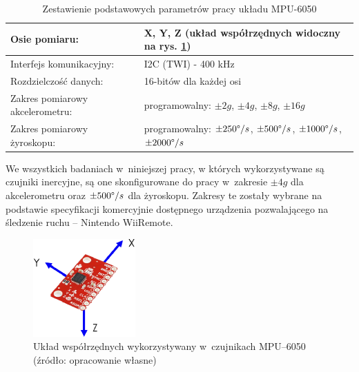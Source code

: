 \begin{table}[h]
	\caption[Zestawienie podstawowych parametrów pracy układu MPU-6050]{Zestawienie podstawowych parametrów pracy układu MPU-6050}
	\label{tab:characteristics:mpu:spec}
	\noindent
	\small
	\centering
	\begin{tabular}{|p{5cm}|p{8cm}|}
		\hline 
		Osie pomiaru:                             & X, Y, Z \newline (układ współrzędnych widoczny na rys. \ref{fig:characteristics:imu:space})               \\
		\hline
		Interfejs komunikacyjny:                  & I2C (TWI) - 400 kHz                                                                                           \\
		\hline
		Rozdzielczość danych:                   & 16-bitów dla każdej osi                                                                                     \\
		\hline
		Zakres pomiarowy  \newline akcelerometru: & programowalny: \newline $\pm2g$, \textbf{$\pm4g$}, $\pm8g$, $\pm16g$                                          \\
		\hline
		Zakres pomiarowy żyroskopu:              & programowalny: \newline $\pm250\degree/s$, \textbf{$\pm500\degree/s$}, $\pm1000\degree/s$, $\pm2000\degree/s$ \\
		\hline
	\end{tabular} 	
\end{table} 																																									
We wszystkich badaniach w~niniejszej pracy, w których wykorzystywane są czujniki inercyjne, są one skonfigurowane do pracy w~zakresie  $\pm4g$ dla akcelerometru oraz $\pm500\degree/s$ dla żyroskopu. Zakresy te zostały wybrane na podstawie specyfikacji komercyjnie dostępnego urządzenia pozwalającego na śledzenie ruchu -- Nintendo WiiRemote.
																																								
\begin{savenotes}
	\begin{figure}[!htb]
		\centering 
		\includegraphics[width=0.35\textwidth]{images/imuCoordinationSpace.eps}	
		\caption{Układ współrzędnych wykorzystywany w~czujnikach MPU--6050 (źródło: opracowanie własne)}
		\label{fig:characteristics:imu:space}
	\end{figure}
\end{savenotes}
																						
